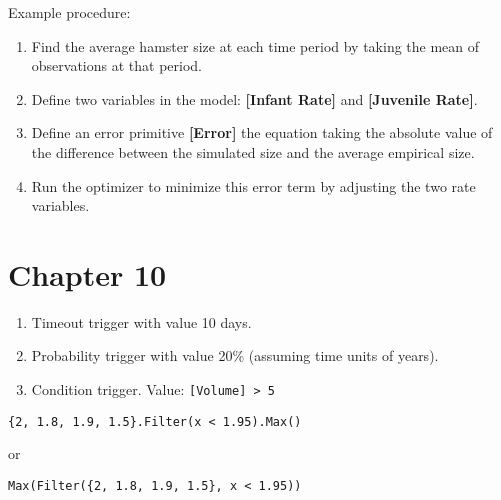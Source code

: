 \documentclass[]{memoir}
\newcommand{\p}[1]{\textbf{{[}#1{]}}}
\begin{document}
Example procedure:

\begin{enumerate}
\def\labelenumi{\arabic{enumi}.}
\itemsep1pt\parskip0pt
\item
  Find the average hamster size at each time period by taking the mean
  of observations at that period.
\item
  Define two variables in the model: \p{Infant Rate} and
  \p{Juvenile Rate}.
\item
  Define an error primitive \p{Error} the equation taking the absolute
  value of the difference between the simulated size and the average
  empirical size.
\item
  Run the optimizer to minimize this error term by adjusting the two
  rate variables.
\end{enumerate}

\section{Chapter 10}


\begin{enumerate}
\def\labelenumi{\arabic{enumi}.}
\itemsep1pt\parskip0pt
\item
  Timeout trigger with value 10 days.
\item
  Probability trigger with value 20\% (assuming time units of years).
\item
  Condition trigger. Value: \lstinline![Volume] > 5!
\end{enumerate}


\lstinline!{2, 1.8, 1.9, 1.5}.Filter(x < 1.95).Max()!

or

\lstinline!Max(Filter({2, 1.8, 1.9, 1.5}, x < 1.95))!

\end{document}
